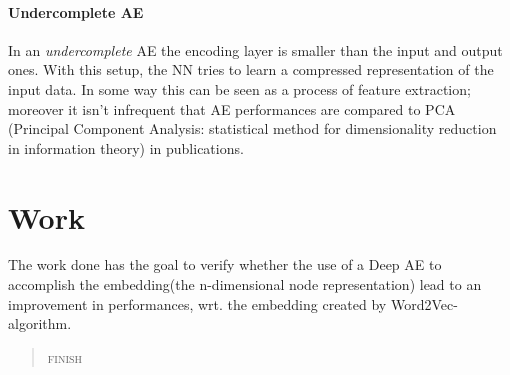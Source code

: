 \documentclass{article}
\begin{document}
			\paragraph{Undercomplete AE}
			In an \textit{undercomplete} AE the encoding layer is smaller than the input and output ones. With this setup, the NN tries to learn a compressed representation of the input data. In some way this can be seen as a process of feature extraction; moreover it isn't infrequent that AE performances are compared to PCA (Principal Component Analysis: statistical method for dimensionality reduction in information theory) in publications.
			\par \noindent \newline
			
		\section{Work}
			The work done has the goal to verify whether the use of a Deep AE to accomplish the embedding(the n-dimensional node representation) lead to an improvement in performances, wrt. the embedding created by Word2Vec-algorithm.
			\begin{quote}
				\centering
				\textsc{finish}
			\end{quote}
			
\end{document}
